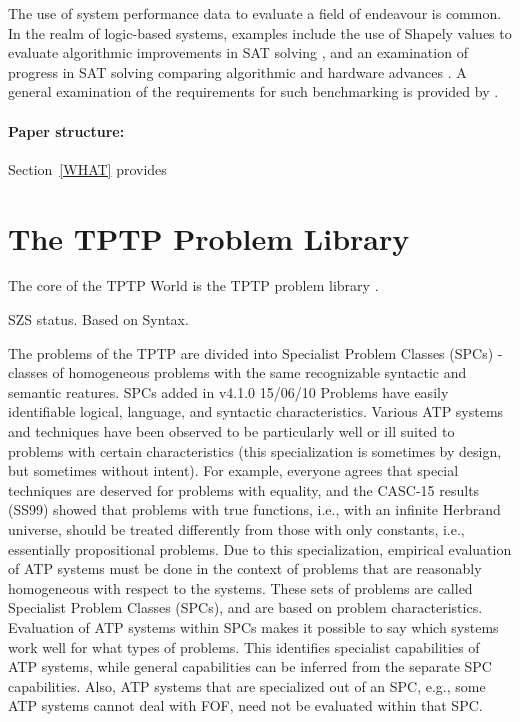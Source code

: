 \documentclass[runningheads]{llncs}
\begin{document}
The use of system performance data to evaluate a field of endeavour is common.
In the realm of logic-based systems, examples include
the use of Shapely values to evaluate algorithmic improvements in SAT solving \cite{KF+19},
and
an examination of progress in SAT solving comparing algorithmic and hardware advances \cite{FHS20}.
A general examination of the requirements for such benchmarking is provided by \cite{BLW19}.

\paragraph{Paper structure:}
Section~\ref{WHAT} provides 

\section{The TPTP Problem Library}
\label{TPTP}

The core of the TPTP World is the TPTP problem library \cite{Sut09}.

SZS status. Based on Syntax.

The problems of the TPTP are divided into Specialist Problem Classes (SPCs) - classes of 
homogeneous problems with the same recognizable syntactic and semantic reatures.
SPCs added in v4.1.0 15/06/10
Problems have easily identifiable logical, language, and syntactic characteristics. 
Various ATP systems and techniques have been observed to be particularly well or ill suited to 
problems with certain characteristics (this specialization is sometimes by design, but sometimes 
without intent). 
For example, everyone agrees that special techniques are deserved for problems with equality, 
and the CASC-15 results (SS99) showed that problems with true functions, i.e., with an infinite 
Herbrand universe, should be treated differently from those with only constants, i.e., essentially 
propositional problems. 
Due to this specialization, empirical evaluation of ATP systems must be done in the context of 
problems that are reasonably homogeneous with respect to the systems. 
These sets of problems are called Specialist Problem Classes (SPCs), and are based on problem 
characteristics. 
Evaluation of ATP systems within SPCs makes it possible to say which systems work well for what 
types of problems. 
This identifies specialist capabilities of ATP systems, while general capabilities can be 
inferred from the separate SPC capabilities. Also, ATP systems that are specialized out of 
an SPC, e.g., some ATP systems cannot deal with FOF, need not be evaluated within that SPC.
\end{document}
